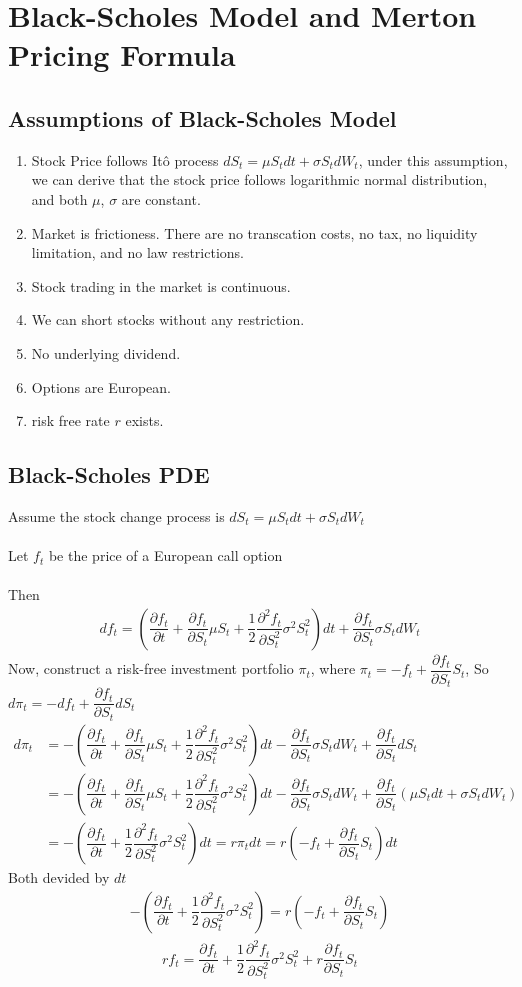 \documentclass[12pt]{article}
\newcommand{\pfpt}{\dfrac{\partial f_t}{\partial t}}
\newcommand{\pfps}{\dfrac{\partial f_t}{\partial S_t}}
\newcommand{\pffpss}{\dfrac{\partial^2 f_t}{\partial S_t^2}}
\begin{document}
\section{Black-Scholes Model and Merton Pricing Formula}
\subsection*{Assumptions of Black-Scholes Model}
\begin{enumerate}
    \item Stock Price follows It\^{o} process $dS_t = \mu S_tdt + \sigma S_tdW_t$, under this assumption, we can derive that the stock price follows logarithmic normal distribution, and both $\mu$, $\sigma$ are constant.
    \item Market is frictioness. There are no transcation costs, no tax, no liquidity limitation, and no law restrictions.
    \item Stock trading in the market is continuous.
    \item We can short stocks without any restriction.
    \item No underlying dividend.
    \item Options are European.
    \item risk free rate $r$ exists. 
\end{enumerate}
\subsection*{Black-Scholes PDE}
Assume the stock change process is $dS_t = \mu S_tdt + \sigma S_tdW_t$\\\\
Let $f_t$ be the price of a European call option\\\\
Then
\begin{align*}
    df_t = (\pfpt + \pfps \mu S_t + \dfrac{1}{2}\pffpss \sigma^2 S_t^2)dt + \pfps \sigma S_tdW_t
\end{align*}
Now, construct a risk-free investment portfolio $\pi_t$, where $\pi_t = -f_t + \pfps S_t$, So $d\pi_t = -df_t + \pfps dS_t$
\begin{align*}
    d\pi_t &= -(\pfpt + \pfps \mu S_t + \dfrac{1}{2}\pffpss \sigma^2 S_t^2)dt - \pfps \sigma S_tdW_t + \pfps dS_t\\
    &= -(\pfpt + \pfps \mu S_t + \dfrac{1}{2}\pffpss \sigma^2 S_t^2)dt - \pfps \sigma S_tdW_t + \pfps (\mu S_tdt + \sigma S_tdW_t)\\
    &= -(\pfpt + \dfrac{1}{2}\pffpss \sigma^2 S_t^2)dt = r\pi_tdt = r(-f_t + \pfps S_t)dt
\end{align*}
Both devided by $dt$
\begin{align*}
    -(\pfpt + \dfrac{1}{2}\pffpss \sigma^2 S_t^2) = r(-f_t + \pfps S_t)
\end{align*}
\begin{align*}
    rf_t = \pfpt + \dfrac{1}{2}\pffpss \sigma^2 S_t^2 + r\pfps S_t
\end{align*}
\end{document}

